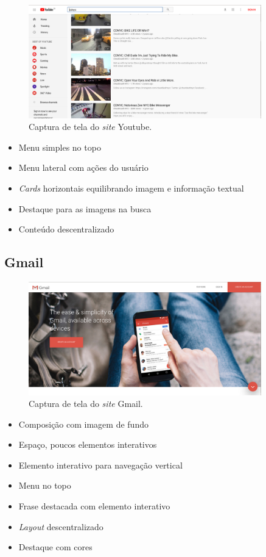 \begin{figure}[!htbp]
\centering
\caption{\label{fig-yt}Captura de tela do \emph{site} Youtube.}
\includegraphics[width=0.9\textwidth]{images/tendencias/yt-busca.png}
\end{figure}

\begin{itemize}
\tightlist
\item
  Menu simples no topo
\item
  Menu lateral com ações do usuário
\item
  \emph{Cards} horizontais equilibrando imagem e informação textual
\item
  Destaque para as imagens na busca
\item
  Conteúdo descentralizado
\end{itemize}

\subsection{Gmail}\label{gmail}

\begin{figure}[!htbp]
\centering
\caption{\label{fig-gmail}Captura de tela do \emph{site} Gmail.}
\includegraphics[width=0.9\textwidth]{images/tendencias/gmail.png}
\end{figure}

\begin{itemize}
\tightlist
\item
  Composição com imagem de fundo
\item
  Espaço, poucos elementos interativos
\item
  Elemento interativo para navegação vertical
\item
  Menu no topo
\item
  Frase destacada com elemento interativo
\item
  \emph{Layout} descentralizado
\item
  Destaque com cores
\end{itemize}

